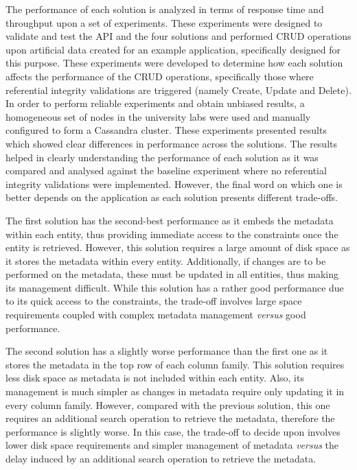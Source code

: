 

The performance of each solution is analyzed in terms of response time and
throughput upon a set of experiments.
These experiments were designed to validate and test the \ac{API} and the four
solutions and  performed \ac{CRUD} operations upon artificial data created
for an example application, specifically designed for this purpose. These
experiments were developed  to determine how each solution affects the
performance of the \ac{CRUD} operations,  specifically those where referential
integrity validations are triggered (namely Create,  Update and Delete). In
order to perform reliable experiments and obtain unbiased results,  a
homogeneous set of nodes in the university labs were used and manually configured to form a
Cassandra cluster. These experiments presented results which showed  clear
differences in  performance across the solutions. The results  helped in clearly
understanding the performance of each solution as it was compared and analysed
against the baseline experiment where no referential integrity validations were
implemented. However, the final word on which one is better depends on the
application as each solution presents different trade-offs.





The first solution has the second-best performance as it embeds the metadata
within each entity, thus providing immediate access to the constraints once the
entity is retrieved. However, this solution requires a large amount of disk
space as it stores the metadata within every entity. Additionally, if changes
are to be performed on the metadata, these must be updated in all entities, thus
making its management difficult.
While this solution has a rather good performance due to its quick access to the
constraints, the trade-off  involves large space requirements
coupled with complex metadata management \textit{versus} good performance.


The second solution has a slightly worse performance than the first one as it
stores the metadata in the top row of each column family. This solution requires
less disk space as metadata is not included within each entity. Also, its
management is much simpler as changes in metadata  require only updating it in
every column family. However, compared with the previous solution,  this one
requires an additional search operation to retrieve the metadata, therefore the
performance is slightly worse. In this case, the trade-off to decide upon
involves lower disk space requirements and simpler management  of metadata
\textit{versus} the delay induced by an additional search operation to retrieve
the metadata.


